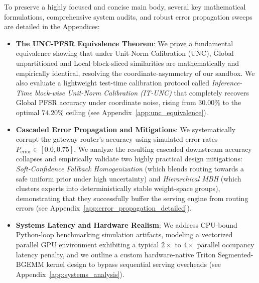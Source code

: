 To preserve a highly focused and concise main body, several key mathematical formulations, comprehensive system audits, and robust error propagation sweeps are detailed in the Appendices:
\begin{itemize}
    \item \textbf{The UNC-PFSR Equivalence Theorem}: We prove a fundamental equivalence showing that under Unit-Norm Calibration (UNC), Global unpartitioned and Local block-sliced similarities are mathematically and empirically identical, resolving the coordinate-asymmetry of our sandbox. We also evaluate a lightweight test-time calibration protocol called \emph{Inference-Time block-wise Unit-Norm Calibration (IT-UNC)} that completely recovers Global PFSR accuracy under coordinate noise, rising from $30.00\%$ to the optimal $74.20\%$ ceiling (see Appendix~\ref{app:unc_equivalence}).
    \item \textbf{Cascaded Error Propagation and Mitigations}: We systematically corrupt the gateway router's accuracy using simulated error rates $P_{\text{error}} \in [0.0, 0.75]$. We analyze the resulting cascaded downstream accuracy collapses and empirically validate two highly practical design mitigations: \emph{Soft-Confidence Fallback Homogenization} (which blends routing towards a safe uniform prior under high uncertainty) and \emph{Hierarchical MBH} (which clusters experts into deterministically stable weight-space groups), demonstrating that they successfully buffer the serving engine from routing errors (see Appendix~\ref{app:error_propagation_detailed}).
    \item \textbf{Systems Latency and Hardware Realism}: We address CPU-bound Python-loop benchmarking simulation artifacts, modeling a vectorized parallel GPU environment exhibiting a typical $2\times$ to $4\times$ parallel occupancy latency penalty, and we outline a custom hardware-native Triton Segmented-BGEMM kernel design to bypass sequential serving overheads (see Appendix~\ref{app:systems_analysis}).
\end{itemize}